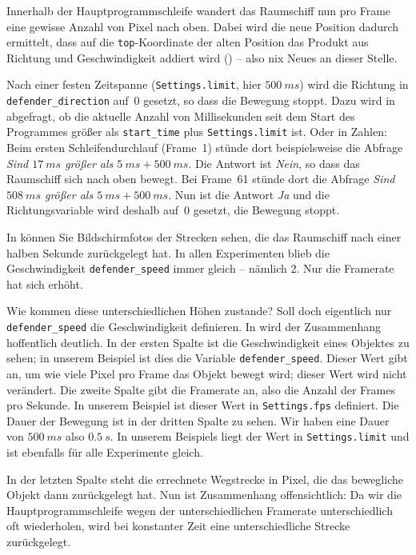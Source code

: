 Innerhalb der Hauptprogrammschleife wandert das Raumschiff nun pro Frame eine gewisse Anzahl von Pixel nach oben. Dabei wird die neue Position dadurch ermittelt, dass auf die \texttt{top}-Koordinate der alten Position das Produkt aus Richtung und Geschwindigkeit addiert wird () -- also nix Neues an dieser Stelle.

Nach einer festen Zeitspanne (\texttt{Settings.limit}, hier $500~ms$) wird die Richtung in \texttt{defender\_direction} auf~0 gesetzt, so dass die Bewegung stoppt. Dazu wird in  abgefragt, ob die aktuelle Anzahl von Millisekunden seit dem Start des Programmes größer als \texttt{start\_time} plus \texttt{Settings.limit} ist. Oder in Zahlen: Beim ersten Schleifendurchlauf (Frame~1) stünde dort beispielsweise die Abfrage \emph{Sind $17~ms$ größer als $5~ms + 500~ms$}. Die Antwort ist \emph{Nein}, so dass das Raumschiff sich nach oben bewegt. Bei Frame~61 stünde dort die Abfrage \emph{Sind $508~ms$ größer als $5~ms + 500~ms$}. Nun ist die Antwort \emph{Ja} und die Richtungsvariable wird deshalb auf~0 gesetzt, die Bewegung stoppt.


In  können Sie Bildschirmfotos der Strecken sehen, die das Raumschiff nach einer halben Sekunde zurückgelegt hat. In allen Experimenten blieb die Geschwindigkeit \texttt{defender\_speed} immer gleich -- nämlich 2. Nur die Framerate hat sich erhöht.

Wie kommen diese unterschiedlichen Höhen zustande? Soll doch eigentlich nur \texttt{de\-fen\-der\-\_speed} die Geschwindigkeit definieren. In  wird der Zusammenhang hoffentlich deutlich. In der ersten Spalte ist die Geschwindigkeit eines Objektes zu sehen; in unserem Beispiel ist dies die Variable \texttt{defender\_speed}. Dieser Wert gibt an, um wie viele Pixel pro Frame das Objekt bewegt wird; dieser Wert wird nicht verändert. Die zweite Spalte gibt die Framerate an, also die Anzahl der Frames pro Sekunde. In unserem Beispiel ist dieser Wert in \texttt{Settings.fps} definiert. Die Dauer der Bewegung ist in der dritten Spalte zu sehen. Wir haben eine Dauer von $500~ms$ also $0.5~s$. In unserem Beispiels liegt der Wert in \texttt{Settings.limit} und ist ebenfalls für alle Experimente gleich. 

In der letzten Spalte steht die errechnete Wegstrecke in Pixel, die das bewegliche Objekt dann zurückgelegt hat. Nun ist Zusammenhang offensichtlich: Da wir die Hauptprogrammschleife wegen der unterschiedlichen Framerate unterschiedlich oft wiederholen, wird bei konstanter Zeit eine unterschiedliche Strecke zurückgelegt.

